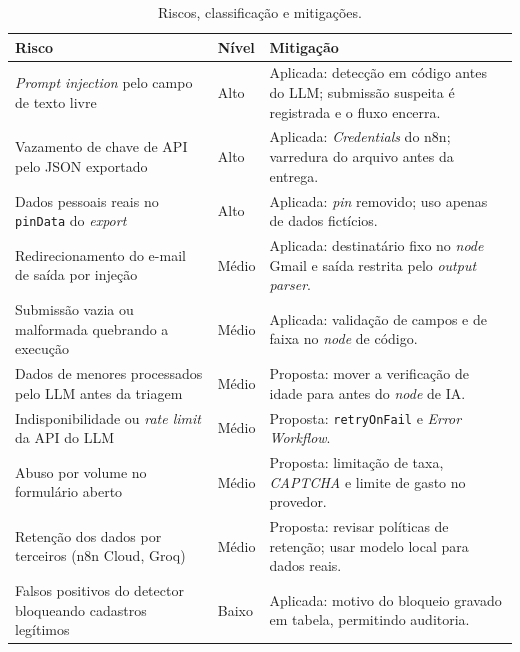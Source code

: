 \documentclass[article,11pt,oneside,a4paper,brazil,section=TITLE]{abntex2}
\begin{document}
\begin{table}[htb]
  \centering
  \caption{Riscos, classificação e mitigações.}
  \label{tab:riscos}
  \small
  \begin{tabularx}{\textwidth}{@{}Yl Y@{}}
    \toprule
    \textbf{Risco} & \textbf{Nível} & \textbf{Mitigação} \\
    \midrule
    \emph{Prompt injection} pelo campo de texto livre & Alto & Aplicada: detecção em código antes do LLM; submissão suspeita é registrada e o fluxo encerra. \\

    Vazamento de chave de API pelo JSON exportado & Alto & Aplicada: \emph{Credentials} do n8n; varredura do arquivo antes da entrega. \\

    Dados pessoais reais no \texttt{pinData} do \emph{export} & Alto & Aplicada: \emph{pin} removido; uso apenas de dados fictícios. \\

    Redirecionamento do e-mail de saída por injeção & Médio & Aplicada: destinatário fixo no \emph{node} Gmail e saída restrita pelo \emph{output parser}. \\

    Submissão vazia ou malformada quebrando a execução & Médio & Aplicada: validação de campos e de faixa no \emph{node} de código. \\

    Dados de menores processados pelo LLM antes da triagem & Médio & Proposta: mover a verificação de idade para antes do \emph{node} de IA. \\

    Indisponibilidade ou \emph{rate limit} da API do LLM & Médio & Proposta: \texttt{retryOnFail} e \emph{Error Workflow}. \\

    Abuso por volume no formulário aberto & Médio & Proposta: limitação de taxa, \emph{CAPTCHA} e limite de gasto no provedor. \\

    Retenção dos dados por terceiros (n8n Cloud, Groq) & Médio & Proposta: revisar políticas de retenção; usar modelo local para dados reais. \\

    Falsos positivos do detector bloqueando cadastros legítimos & Baixo & Aplicada: motivo do bloqueio gravado em tabela, permitindo auditoria. \\

    \bottomrule
  \end{tabularx}
\end{table}
\end{document}
